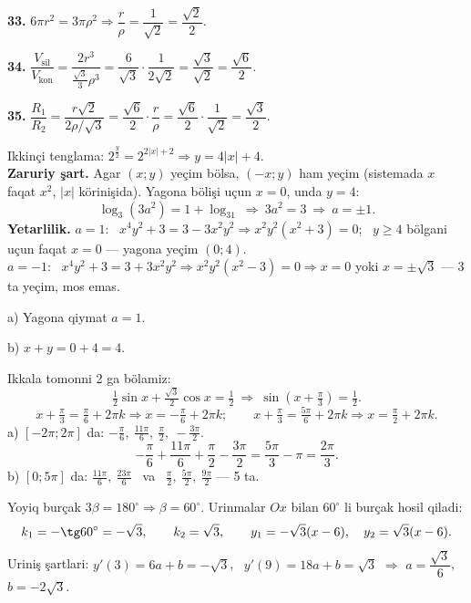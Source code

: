 \textbf{33.} $6\pi r^2=3\pi\rho^2\Rightarrow\dfrac r\rho=\dfrac1{\sqrt2}=\dfrac{\sqrt2}2$.

\textbf{34.} $\dfrac{V_{\text{sil}}}{V_{\text{kon}}}=\dfrac{2r^3}{\frac{\sqrt3}3\rho^3}=\dfrac6{\sqrt3}\cdot\dfrac1{2\sqrt2}=\dfrac{\sqrt3}{\sqrt2}=\dfrac{\sqrt6}2$.

\textbf{35.} $\dfrac{R_1}{R_2}=\dfrac{r\sqrt2}{2\rho/\sqrt3}=\dfrac{\sqrt6}2\cdot\dfrac r\rho=\dfrac{\sqrt6}2\cdot\dfrac1{\sqrt2}=\dfrac{\sqrt3}2$.

\newpage
{}
Ikkinçi tenglama: $2^{\frac y2}=2^{2|x|+2}\Rightarrow y=4|x|+4$.\\
\textbf{Zaruriy şart.} Agar $(x;y)$ yeçim bölsa, $(-x;y)$ ham yeçim (sistemada $x$ faqat $x^2$, $|x|$ körinişida). Yagona bölişi uçun $x=0$, unda $y=4$:
\[\log_3(3a^2)=1+\log_31\ \Rightarrow\ 3a^2=3\ \Rightarrow\ a=\pm1.\]
\textbf{Yetarlilik.} $a=1$: \ $x^4y^2+3=3-3x^2y^2\Rightarrow x^2y^2(x^2+3)=0$; \ $y\ge4$ bölgani uçun faqat $x=0$ — yagona yeçim $(0;4)$.\\
$a=-1$: \ $x^4y^2+3=3+3x^2y^2\Rightarrow x^2y^2(x^2-3)=0\Rightarrow x=0$ yoki $x=\pm\sqrt3$ — 3 ta yeçim, mos emas.

a) Yagona qiymat $a=1$.

b) $x+y=0+4=4$.

\newpage
{}
Ikkala tomonni 2 ga bölamiz:
\[\tfrac12\sin x+\tfrac{\sqrt3}2\cos x=\tfrac12\ \Rightarrow\ \sin\left(x+\tfrac\pi3\right)=\tfrac12.\]
\[x+\tfrac\pi3=\tfrac\pi6+2\pi k\Rightarrow x=-\tfrac\pi6+2\pi k;\qquad x+\tfrac\pi3=\tfrac{5\pi}6+2\pi k\Rightarrow x=\tfrac\pi2+2\pi k.\]
a) $[-2\pi;2\pi]$ da: $-\frac\pi6,\ \frac{11\pi}6,\ \frac\pi2,\ -\frac{3\pi}2$.
\[-\frac\pi6+\frac{11\pi}6+\frac\pi2-\frac{3\pi}2=\frac{5\pi}3-\pi=\frac{2\pi}3.\]
b) $[0;5\pi]$ da: $\frac{11\pi}6,\ \frac{23\pi}6$ \ va \ $\frac\pi2,\ \frac{5\pi}2,\ \frac{9\pi}2$ — 5 ta.

\newpage
{}
Yoyiq burçak $3\beta=180^\circ\Rightarrow\beta=60^\circ$. Urinmalar $Ox$ bilan $60^\circ$ li burçak hosil qiladi:
\[k_1=-\tg60^\circ=-\sqrt3,\qquad k_2=\sqrt3,\qquad y_1=-\sqrt3(x-6),\quad y_2=\sqrt3(x-6).\]
Uriniş şartlari: $y'(3)=6a+b=-\sqrt3$, \ $y'(9)=18a+b=\sqrt3$ $\Rightarrow$ $a=\dfrac{\sqrt3}6$, \ $b=-2\sqrt3$.

